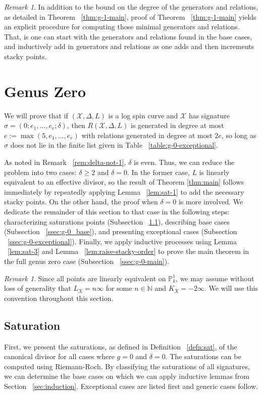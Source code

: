 \documentclass{amsart}
\theoremstyle{plain}
\theoremstyle{definition}
\theoremstyle{remark}
\newtheorem{rem}[thm]{Remark}
\numberwithin{equation}{section}
\newcommand\ssec{\subsection}
\newcommand\BN{{\mathbb N}}
\newcommand\BP{{\mathbb P}}
\newcommand\sx{\mathscr X}
\newcommand{\halfcan}{L}
\begin{document}
\begin{rem}
In addition to the bound on the degree of the generators and relations, as detailed in Theorem ~\ref{thm:g-1-main}, proof of Theorem ~\ref{thm:g-1-main} yields an explicit procedure for computing those minimal generators and relations. That, is one can start with the generators and relations found in the base cases, and inductively add in generators and relations as one adds and then increments stacky points.
\end{rem}


\section{Genus Zero}
\label{sec:g-0}
We will prove that if $(\sx, \Delta, \halfcan)$ is a log spin
curve and $\sx$ has signature $\sigma = (0; e_1, \ldots, e_r;
\delta)$, then $R(\sx, \Delta, L)$ is generated in degree at most
$e := \max(5, e_1, \ldots, e_r)$ with relations generated in degree
at most $2e$, so long as $\sigma$ does not lie in the finite list
given in Table ~\ref{table:g-0-exceptional}.

As noted in Remark ~\ref{rem:delta-not-1}, $\delta$ is even. Thus,
we can reduce the problem into two cases: $\delta \geq 2$ and
$\delta = 0$. In the former case, $\halfcan$ is linearly equivalent
to an effective divisor, so the result of Theorem \ref{thm:main}
follows immediately by repeatedly applying Lemma ~\ref{lem:sat-1}
to add the necessary stacky points. On the other hand, the proof
when $\delta = 0$ is more involved. We dedicate the remainder of
this section to that case in the following steps: characterizing
saturations points (Subsection ~\ref{ssec:g-0_saturation}),
describing base cases (Subsection ~\ref{ssec:g-0_base}), and
presenting exceptional cases (Subsection ~\ref{ssec:g-0-exceptional}).
Finally, we apply inductive processes using Lemma ~\ref{lem:sat-3}
and Lemma ~\ref{lem:raise-stacky-order} to prove the main theorem
in the full genus zero case (Subsection ~\ref{ssec:g-0-main}).
 
\begin{rem}
Since all points are linearly equivalent on $\BP^1_k$, we may
assume without loss of generality that $L_X = n \infty$ for some $n
\in \BN$ and $K_X = -2 \infty$. We will use this convention
throughout this section.
\end{rem}

\ssec{Saturation}
\label{ssec:g-0_saturation}
First, we present the saturations, as defined in Definition
~\ref{defn:sat}, of the canonical divisor for
all cases where $g = 0$ and $\delta = 0$. The saturations can be computed using Riemann-Roch.
By classifying the saturations of all signatures, we can determine
the base cases on which we can apply inductive lemmas from
Section ~\ref{sec:induction}. Exceptional cases are listed first
and generic cases follow.
\end{document}
